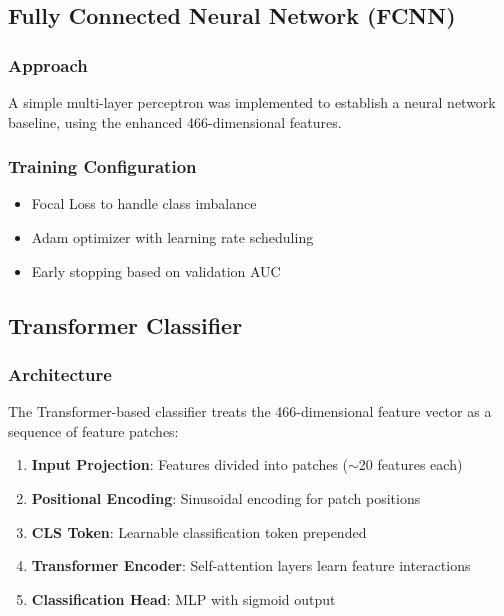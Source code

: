 \documentclass[11pt,a4paper]{article}
\begin{document}
\subsection{Fully Connected Neural Network (FCNN)}

\subsubsection{Approach}
A simple multi-layer perceptron was implemented to establish a neural network baseline, using the enhanced 466-dimensional features.

\subsubsection{Training Configuration}
\begin{itemize}
    \item Focal Loss to handle class imbalance
    \item Adam optimizer with learning rate scheduling
    \item Early stopping based on validation AUC
\end{itemize}

\subsection{Transformer Classifier}

\subsubsection{Architecture}
The Transformer-based classifier treats the 466-dimensional feature vector as a sequence of feature patches:

\begin{enumerate}
    \item \textbf{Input Projection}: Features divided into patches ($\sim$20 features each)
    \item \textbf{Positional Encoding}: Sinusoidal encoding for patch positions
    \item \textbf{CLS Token}: Learnable classification token prepended
    \item \textbf{Transformer Encoder}: Self-attention layers learn feature interactions
    \item \textbf{Classification Head}: MLP with sigmoid output
\end{enumerate}
\end{document}
